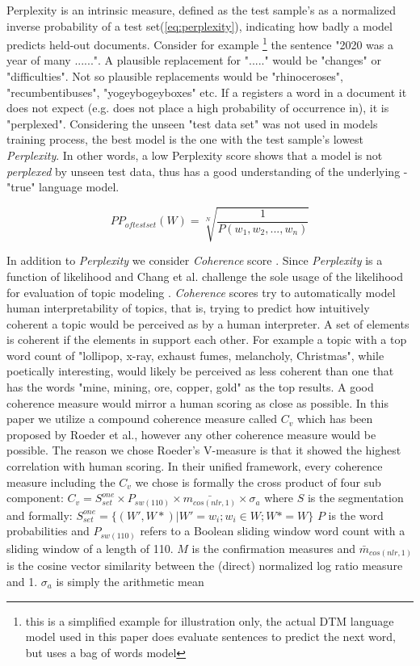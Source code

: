 \documentclass[12pt,journal,letterpaper,oneside,onecolumn]{IEEEtran}
\begin{document}
Perplexity is an intrinsic measure, defined as the test sample's as a normalized inverse probability of a test set(\ref{eq:perplexity}), indicating how badly a model predicts held-out documents.
Consider for example \footnote{this is a simplified example for illustration only, the actual DTM language model used in this paper does evaluate sentences to predict the next word, but uses a bag of words model} the sentence "2020 was a year of many ......".
A plausible replacement for "....." would be "changes" or "difficulties". Not so plausible replacements would be "rhinoceroses", "recumbentibuses", "yogeybogeyboxes" etc. If a registers a word in a document it does not expect (e.g. does not place a high probability of occurrence in), it is "perplexed".
Considering the unseen "test data set" was not used in models training process, the best model is the one with the test sample's lowest \textit{Perplexity}. In other words, a low Perplexity score shows that a model is not \textit{perplexed} by unseen test data, thus has a good understanding of the underlying - "true" language model.

\begin{equation}
    \label{eq:perplexity}
    PP_{of test set}(W) = \sqrt[N]{\frac{1}{P(w_1, w_2, ... , w_n)}}
\end{equation}

In addition to \textit{Perplexity} we consider \textit{Coherence} score\cite{ref_lda_coh_exploring} \cite{ref_lda_coh_1} \cite{ref_lda_coh_2} \cite{ref_lda_coh_3}. Since \textit{Perplexity} is a function of likelihood and Chang et al.\cite{ref_lda_human_evaluation} challenge the sole usage of the likelihood for evaluation of topic modeling .
\textit{Coherence} scores try to automatically model human interpretability of topics, that is, trying to predict how intuitively coherent a topic would be perceived as by a human interpreter. 
A set of elements is coherent if the elements in support each other.
For example a topic with a top word count of "lollipop, x-ray, exhaust fumes, melancholy, Christmas", while poetically interesting, would likely be perceived as less coherent than one that has the words "mine, mining, ore, copper, gold" as the top results.
A good coherence measure would mirror a human scoring as close as possible.
In this paper we utilize a compound coherence measure called $C_v$ which has been proposed by Roeder et al.\cite{ref_lda_coh_exploring}, however any other coherence measure would be possible.
The reason we chose Roeder's V-measure is that it showed the highest correlation with human scoring.
In their unified framework, every coherence measure including the  $C_v$ we chose is formally the cross product of four sub component: $C_v  = S^{one}_{set} \times P_{sw(110)} \times \bar{m_{cos(nlr,1)}} \times \sigma_a$ where $S$ is the segmentation and formally:
$S^{one}_{set} = \Big\{ (W', W*) | W' = {w_i}; w_i \in W; W* = W \Big\}$
$P$ is the word probabilities and  $P_{sw(110)}$ refers to a Boolean sliding window word count with a sliding window of a length of 110. 
$M$ is the confirmation measures and $\bar{m}_{cos(nlr,1)}$ is the cosine vector similarity between the (direct) normalized log ratio measure and 1.
$\sigma_a$ is simply the arithmetic mean
\end{document}
